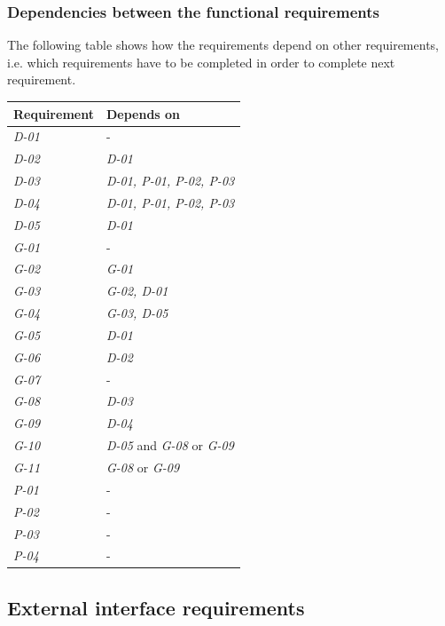 \documentclass[a4paper,11pt]{article}
\begin{document}
\subsubsection{Dependencies between the functional requirements}
The following table shows how the requirements depend on other requirements, i.e. which requirements have to be completed
in order to complete next requirement.

\begin{tabular}{|l|l|}							\hline
\textbf{Requirement}					& \textbf{Depends on} 	  \\ \hline
\emph{D-01}			& -					  					\\ \hline
\emph{D-02}			& \emph{D-01}		  						\\ \hline
\emph{D-03}			& \emph{D-01, P-01, P-02, P-03}	\\ \hline
\emph{D-04}			& \emph{D-01, P-01, P-02, P-03}	\\ \hline
\emph{D-05}			& \emph{D-01}		  						\\ \hline
\emph{G-01}			& -					 						\\ \hline
\emph{G-02}			& \emph{G-01}		  						\\ \hline
\emph{G-03}			& \emph{G-02, D-01}		  				\\ \hline
\emph{G-04	}			& \emph{G-03, D-05}		  				\\ \hline
\emph{G-05}			& \emph{D-01}		  						\\ \hline
\emph{G-06}			& \emph{D-02}		  						\\ \hline
\emph{G-07}			& -					  						\\ \hline
\emph{G-08}			& \emph{D-03}		 						\\ \hline
\emph{G-09}			& \emph{D-04}		  						\\ \hline
\emph{G-10}			& \emph{D-05} and \emph{G-08} or \emph{G-09}		  		\\ \hline
\emph{G-11}			& \emph{G-08} or \emph{G-09}				\\ \hline
\emph{P-01}			& -				  							\\ \hline
\emph{P-02}			& -				  							\\ \hline
\emph{P-03}			& -				  							\\ \hline
\emph{P-04}			& -				  							\\ \hline
\end{tabular}


\subsection{External interface requirements}
\end{document}
